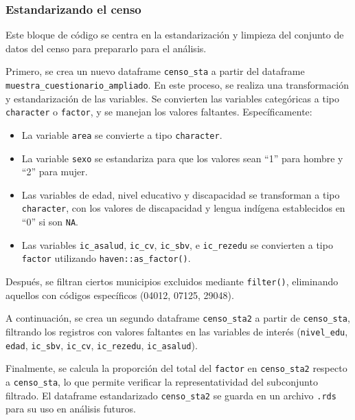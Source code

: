 \documentclass[
  12pt,
]{book}
\providecommand{\tightlist}{%
  \setlength{\itemsep}{0pt}\setlength{\parskip}{0pt}}
\begin{document}
\hypertarget{estandarizando-el-censo}{%
\subsubsection*{Estandarizando el censo}\label{estandarizando-el-censo}}

Este bloque de código se centra en la estandarización y limpieza del conjunto de datos del censo para prepararlo para el análisis.

Primero, se crea un nuevo dataframe \texttt{censo\_sta} a partir del dataframe \texttt{muestra\_cuestionario\_ampliado}. En este proceso, se realiza una transformación y estandarización de las variables. Se convierten las variables categóricas a tipo \texttt{character} o \texttt{factor}, y se manejan los valores faltantes. Específicamente:

\begin{itemize}
\tightlist
\item
  La variable \texttt{area} se convierte a tipo \texttt{character}.
\item
  La variable \texttt{sexo} se estandariza para que los valores sean ``1'' para hombre y ``2'' para mujer.
\item
  Las variables de edad, nivel educativo y discapacidad se transforman a tipo \texttt{character}, con los valores de discapacidad y lengua indígena establecidos en ``0'' si son \texttt{NA}.
\item
  Las variables \texttt{ic\_asalud}, \texttt{ic\_cv}, \texttt{ic\_sbv}, e \texttt{ic\_rezedu} se convierten a tipo \texttt{factor} utilizando \texttt{haven::as\_factor()}.
\end{itemize}

Después, se filtran ciertos municipios excluidos mediante \texttt{filter()}, eliminando aquellos con códigos específicos (04012, 07125, 29048).

A continuación, se crea un segundo dataframe \texttt{censo\_sta2} a partir de \texttt{censo\_sta}, filtrando los registros con valores faltantes en las variables de interés (\texttt{nivel\_edu}, \texttt{edad}, \texttt{ic\_sbv}, \texttt{ic\_cv}, \texttt{ic\_rezedu}, \texttt{ic\_asalud}).

Finalmente, se calcula la proporción del total del \texttt{factor} en \texttt{censo\_sta2} respecto a \texttt{censo\_sta}, lo que permite verificar la representatividad del subconjunto filtrado. El dataframe estandarizado \texttt{censo\_sta2} se guarda en un archivo \texttt{.rds} para su uso en análisis futuros.
\end{document}
